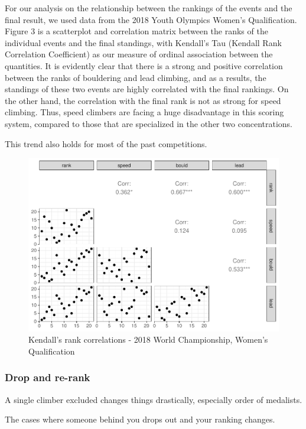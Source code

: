 \documentclass[12pt]{article}
\begin{document}
For our analysis on the relationship between the rankings of the events
and the final result, we used data from the 2018 Youth Olympics Women's
Qualification. Figure 3 is a scatterplot and correlation matrix between
the ranks of the individual events and the final standings, with
Kendall's Tau (Kendall Rank Correlation Coefficient) as our measure of
ordinal association between the quantities. It is evidently clear that
there is a strong and positive correlation between the ranks of
bouldering and lead climbing, and as a results, the standings of these
two events are highly correlated with the final rankings. On the other
hand, the correlation with the final rank is not as strong for speed
climbing. Thus, speed climbers are facing a huge disadvantage in this
scoring system, compared to those that are specialized in the other two
concentrations.

This trend also holds for most of the past competitions.

\begin{figure}
\centering
\includegraphics{draft_files/figure-latex/unnamed-chunk-9-1.pdf}
\caption{Kendall's rank correlations - 2018 World Championship, Women's
Qualification}
\end{figure}

\hypertarget{drop-and-re-rank}{%
\subsubsection{Drop and re-rank}\label{drop-and-re-rank}}

A single climber excluded changes things drastically, especially order
of medalists.

The cases where someone behind you drops out and your ranking changes.
\end{document}
